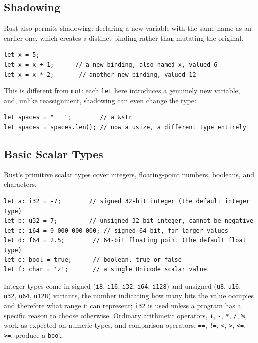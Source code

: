 \documentclass[11pt]{book}
\begin{document}
\subsection*{Shadowing}

Rust also permits shadowing: declaring a new variable with the same name as an earlier one, which creates a distinct binding rather than mutating the original.

\begin{lstlisting}
let x = 5;
let x = x + 1;      // a new binding, also named x, valued 6
let x = x * 2;       // another new binding, valued 12
\end{lstlisting}

This is different from \texttt{mut}: each \texttt{let} here introduces a genuinely new variable, and, unlike reassignment, shadowing can even change the type:

\begin{lstlisting}
let spaces = "   ";        // a &str
let spaces = spaces.len(); // now a usize, a different type entirely
\end{lstlisting}

\subsection*{Basic Scalar Types}

Rust's primitive scalar types cover integers, floating-point numbers, booleans, and characters.

\begin{lstlisting}
let a: i32 = -7;        // signed 32-bit integer (the default integer type)
let b: u32 = 7;         // unsigned 32-bit integer, cannot be negative
let c: i64 = 9_000_000_000; // signed 64-bit, for larger values
let d: f64 = 2.5;        // 64-bit floating point (the default float type)
let e: bool = true;      // boolean, true or false
let f: char = 'z';       // a single Unicode scalar value
\end{lstlisting}

Integer types come in signed (\texttt{i8}, \texttt{i16}, \texttt{i32}, \texttt{i64}, \texttt{i128}) and unsigned (\texttt{u8}, \texttt{u16}, \texttt{u32}, \texttt{u64}, \texttt{u128}) variants, the number indicating how many bits the value occupies and therefore what range it can represent; \texttt{i32} is used unless a program has a specific reason to choose otherwise. Ordinary arithmetic operators, \texttt{+}, \texttt{-}, \texttt{*}, \texttt{/}, \texttt{\%}, work as expected on numeric types, and comparison operators, \texttt{==}, \texttt{!=}, \texttt{<}, \texttt{>}, \texttt{<=}, \texttt{>=}, produce a \texttt{bool}.
\end{document}

